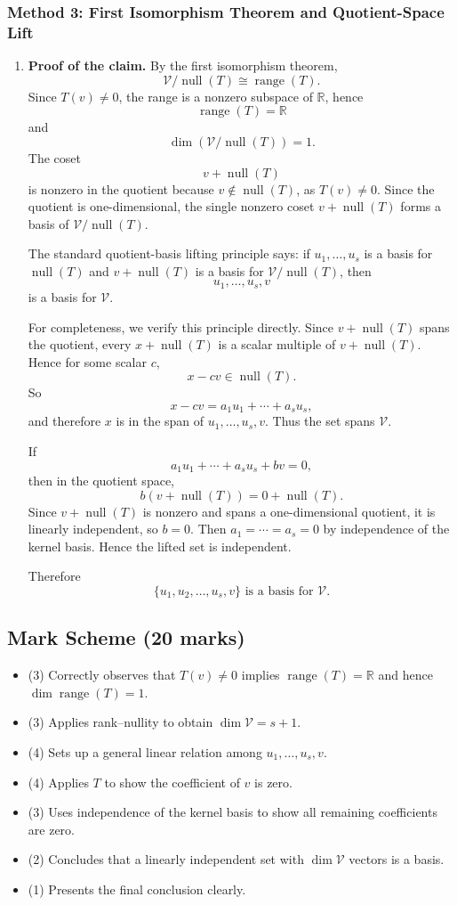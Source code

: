 \documentclass[12pt]{article}
\newcommand{\R}{\mathbb{R}}
\newcommand{\V}{\mathcal{V}}
\newcommand{\Null}{\operatorname{null}}
\newcommand{\Range}{\operatorname{range}}
\begin{document}
\newpage
\subsubsection{Method 3: First Isomorphism Theorem and Quotient-Space Lift}
\begin{enumerate}[label=(\alph*)]
  \item \textbf{Proof of the claim.}
  By the first isomorphism theorem,
  \[
  \V/\Null(T)\cong\Range(T).
  \]
  Since $T(v)\ne0$, the range is a nonzero subspace of $\R$, hence
  \[
  \Range(T)=\R
  \]
  and
  \[
  \dim(\V/\Null(T))=1.
  \]
  The coset
  \[
  v+\Null(T)
  \]
  is nonzero in the quotient because $v\notin\Null(T)$, as $T(v)\ne0$. Since the quotient is one-dimensional, the single nonzero coset $v+\Null(T)$ forms a basis of $\V/\Null(T)$.

  The standard quotient-basis lifting principle says: if $u_1,
  \ldots,u_s$ is a basis for $\Null(T)$ and $v+\Null(T)$ is a basis for $\V/\Null(T)$, then
  \[
  u_1,
  \ldots,u_s,v
  \]
  is a basis for $\V$.

  For completeness, we verify this principle directly. Since $v+\Null(T)$ spans the quotient, every $x+\Null(T)$ is a scalar multiple of $v+\Null(T)$. Hence for some scalar $c$,
  \[
  x-cv\in\Null(T).
  \]
  So
  \[
  x-cv=a_1u_1+\cdots+a_su_s,
  \]
  and therefore $x$ is in the span of $u_1,
  \ldots,u_s,v$. Thus the set spans $\V$.

  If
  \[
  a_1u_1+\cdots+a_su_s+bv=0,
  \]
  then in the quotient space,
  \[
  b(v+\Null(T))=0+\Null(T).
  \]
  Since $v+\Null(T)$ is nonzero and spans a one-dimensional quotient, it is linearly independent, so $b=0$. Then $a_1=\cdots=a_s=0$ by independence of the kernel basis. Hence the lifted set is independent.

  Therefore
  \[
  \boxed{\{u_1,u_2,\ldots,u_s,v\}\text{ is a basis for }\V.}
  \]
\end{enumerate}

\newpage
\subsection{Mark Scheme (20 marks)}
\begin{itemize}[leftmargin=1.6em]
  \item (3) Correctly observes that $T(v)\neq0$ implies $\Range(T)=\R$ and hence $\dim\Range(T)=1$.
  \item (3) Applies rank--nullity to obtain $\dim\V=s+1$.
  \item (4) Sets up a general linear relation among $u_1,\ldots,u_s,v$.
  \item (4) Applies $T$ to show the coefficient of $v$ is zero.
  \item (3) Uses independence of the kernel basis to show all remaining coefficients are zero.
  \item (2) Concludes that a linearly independent set with $\dim\V$ vectors is a basis.
  \item (1) Presents the final conclusion clearly.
\end{itemize}
\end{document}
